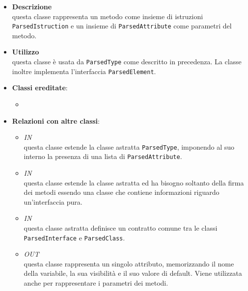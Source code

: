 \label{\nogloxy{swedesigner::server::project::ParsedMethod}}
\begin{itemize}
\item \textbf{Descrizione}\\
questa classe rappresenta un metodo come insieme di istruzioni \texttt{ParsedIstruction} e un insieme di \texttt{ParsedAttribute} come parametri del metodo.
\item \textbf{Utilizzo}\\
questa classe è usata da \texttt{ParsedType} come descritto in precedenza. La classe inoltre implementa l'interfaccia \texttt{ParsedElement}.
\item \textbf{Classi ereditate}:
\begin{itemize}
\item \hyperref[\nogloxy{swedesigner::server::project::ParsedElement}]{}
\end{itemize}
\item \textbf{Relazioni con altre classi}:
\begin{itemize}
\item \textit{IN} \hyperref[\nogloxy{swedesigner::server::project::ParsedClass}]{}\\
questa classe estende la classe astratta \texttt{ParsedType}, imponendo al suo interno la presenza di una lista di \texttt{ParsedAttribute}. 
\item \textit{IN} \hyperref[\nogloxy{swedesigner::server::project::ParsedInterface}]{}\\
questa classe estende la classe astratta  ed ha bisogno soltanto della firma dei metodi essendo una classe che contiene informazioni riguardo un'interfaccia pura.
\item \textit{IN} \hyperref[\nogloxy{swedesigner::server::project::ParsedType}]{}\\
questa classe astratta definisce un contratto comune tra le classi \texttt{ParsedInterface} e \texttt{ParsedClass}. 
\item \textit{OUT} \hyperref[\nogloxy{swedesigner::server::project::ParsedAttribute}]{}\\
questa classe rappresenta un singolo attributo, memorizzando il nome della variabile, la sua visibilità e il suo valore di default. Viene utilizzata anche per rappresentare i parametri dei metodi.

\end{itemize}
\end{itemize}
